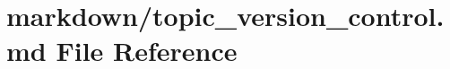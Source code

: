 \hypertarget{topic__version__control_8md}{}\section{markdown/topic\+\_\+version\+\_\+control.md File Reference}
\label{topic__version__control_8md}
